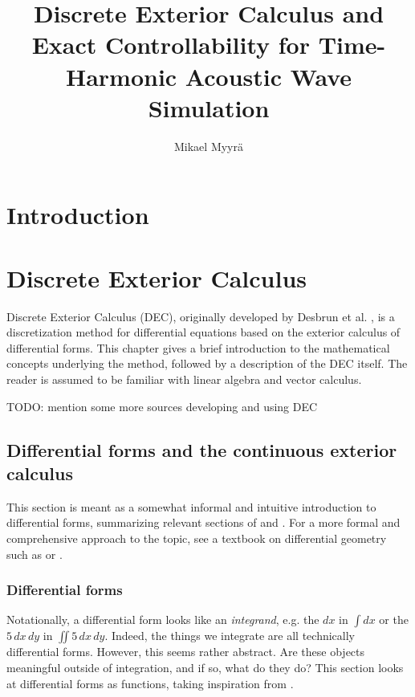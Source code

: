\documentclass[utf8,english]{gradu3}
\title{Discrete Exterior Calculus and Exact Controllability for Time-Harmonic Acoustic Wave Simulation}
\author{Mikael Myyrä}
\begin{document}
\maketitle

\hfuzz=1.5pt
\mainmatter
\hfuzz=0pt


\chapter{Introduction}




\chapter{Discrete Exterior Calculus}

Discrete Exterior Calculus (DEC),
originally developed by Desbrun et al. \parencite*{desbrun_discrete_2005},
is a discretization method for differential equations
based on the exterior calculus of differential forms.
This chapter gives a brief introduction to the mathematical concepts
underlying the method, followed by a description of the DEC itself.
The reader is assumed to be familiar with linear algebra and vector calculus.

TODO: mention some more sources developing and using DEC


\section{Differential forms and the continuous exterior calculus}

This section is meant as a somewhat informal and intuitive introduction
to differential forms, summarizing relevant sections of
\parencite{blair_perot_differential_2014} and \parencite{crane_digital_2013}.
For a more formal and comprehensive approach to the topic,
see a textbook on differential geometry such as \parencite{lee_introduction_2012}
or \parencite{abraham_manifolds_2012}.


\subsection{Differential forms}

Notationally, a differential form looks like an \textit{integrand},
e.g. the $dx$ in $\int dx$ or the $5\,dx\,dy$ in $\iint 5\,dx\,dy$.
Indeed, the things we integrate are all technically differential forms.
However, this seems rather abstract.
Are these objects meaningful outside of integration,
and if so, what do they do?
This section looks at differential forms as functions,
taking inspiration from \parencite{crane_digital_2013}.
\end{document}
